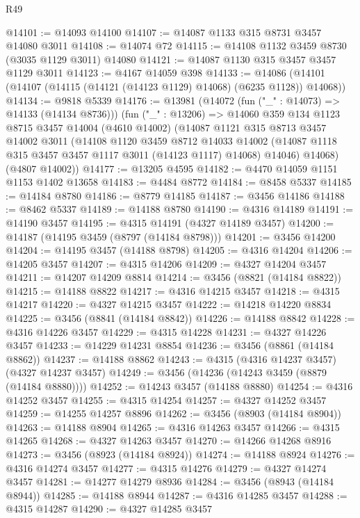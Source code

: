 \begin{lexlean}{R49}
\begin{coremodule}
@14101 := @14093 @14100
@14107 := @14087 @1133 @315 @8731 @3457 @14080 @3011
@14108 := @14074 @72
@14115 := @14108 @1132 @3459 @8730 (@3035 @1129 @3011) @14080
@14121 := @14087 @1130 @315 @3457 @3457 @1129 @3011
@14123 := @4167 @14059 @398
@14133 := @14086 (@14101 (@14107 (@14115 (@14121 (@14123 @1129) @14068) (@6235 @1128)) @14068))
@14134 := @9818 @5339
@14176 := @13981
    (@14072 (fun ("_" : @14073) => @14133 (@14134 @8736)))
    (fun ("_" : @13206) =>
    @14060
      @359
      @134
      @1123
      @8715
      @3457
      @14004
      (@4610 @14002)
      (@14087
        @1121
        @315
        @8713
        @3457
        @14002
        @3011
        (@14108
          @1120
          @3459
          @8712
          @14033
          @14002
          (@14087 @1118 @315 @3457 @3457 @1117 @3011 (@14123 @1117) @14068)
          @14046)
        @14068)
      (@4807 @14002))
@14177 := @13205 @4595
@14182 := @4470 @14059 @1151 @1153 @1402 @13658
@14183 := @4484 @8772
@14184 := @8458 @5337
@14185 := @14184 @8780
@14186 := @8779 @14185
@14187 := @3456 @14186
@14188 := @8462 @5337
@14189 := @14188 @8780
@14190 := @4316 @14189
@14191 := @14190 @3457
@14195 := @4315 @14191 (@4327 @14189 @3457)
@14200 := @14187 (@14195 @3459 (@8797 (@14184 @8798)))
@14201 := @3456 @14200
@14204 := @14195 @3457 (@14188 @8798)
@14205 := @4316 @14204
@14206 := @14205 @3457
@14207 := @4315 @14206
@14209 := @4327 @14204 @3457
@14211 := @14207 @14209 @8814
@14214 := @3456 (@8821 (@14184 @8822))
@14215 := @14188 @8822
@14217 := @4316 @14215 @3457
@14218 := @4315 @14217
@14220 := @4327 @14215 @3457
@14222 := @14218 @14220 @8834
@14225 := @3456 (@8841 (@14184 @8842))
@14226 := @14188 @8842
@14228 := @4316 @14226 @3457
@14229 := @4315 @14228
@14231 := @4327 @14226 @3457
@14233 := @14229 @14231 @8854
@14236 := @3456 (@8861 (@14184 @8862))
@14237 := @14188 @8862
@14243 := @4315 (@4316 @14237 @3457) (@4327 @14237 @3457)
@14249 := @3456 (@14236 (@14243 @3459 (@8879 (@14184 @8880))))
@14252 := @14243 @3457 (@14188 @8880)
@14254 := @4316 @14252 @3457
@14255 := @4315 @14254
@14257 := @4327 @14252 @3457
@14259 := @14255 @14257 @8896
@14262 := @3456 (@8903 (@14184 @8904))
@14263 := @14188 @8904
@14265 := @4316 @14263 @3457
@14266 := @4315 @14265
@14268 := @4327 @14263 @3457
@14270 := @14266 @14268 @8916
@14273 := @3456 (@8923 (@14184 @8924))
@14274 := @14188 @8924
@14276 := @4316 @14274 @3457
@14277 := @4315 @14276
@14279 := @4327 @14274 @3457
@14281 := @14277 @14279 @8936
@14284 := @3456 (@8943 (@14184 @8944))
@14285 := @14188 @8944
@14287 := @4316 @14285 @3457
@14288 := @4315 @14287
@14290 := @4327 @14285 @3457

\end{coremodule}
\end{lexlean}
